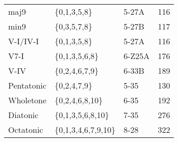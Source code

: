 \documentclass{article}
\begin{document}
\begin{table}[htb]
\begin{center}
\begin{tabular}{lllr}
 maj9        &  \{0,1,3,5,8\}         &  5-27A       &    116  \\
 min9        &  \{0,3,5,7,8\}         &  5-27B       &    117  \\
\hline
 V-I/IV-I    &  \{0,1,3,5,8\}         &  5-27A       &    116  \\
 V7-I        &  \{0,1,3,5,6,8\}       &  6-Z25A      &    176  \\
 V-IV        &  \{0,2,4,6,7,9\}       &  6-33B       &    189  \\
\hline
 Pentatonic  &  \{0,2,4,7,9\}         &  5-35        &    130  \\
 Wholetone   &  \{0,2,4,6,8,10\}      &  6-35        &    192  \\
 Diatonic    &  \{0,1,3,5,6,8,10\}    &  7-35        &    276  \\
 Octatonic   &  \{0,1,3,4,6,7,9,10\}  &  8-28        &    322  \\
\hline
\end{tabular}
\end{center}
\end{table}
\end{document}
